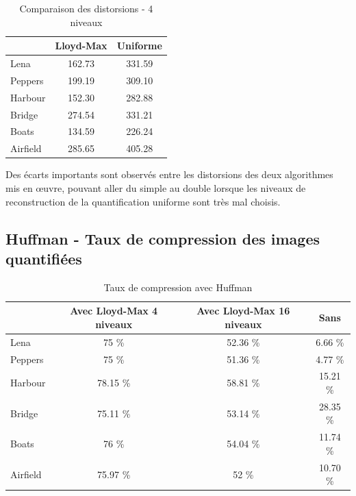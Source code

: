 \documentclass[a4paper, 12pt]{article}
\begin{document}
\begin{table}[!h]
	\centering
		\begin{tabular}{l|c|c|}
			\cline{2-3}
			                               & Lloyd-Max & Uniforme \\
			\hline
			\multicolumn{1}{|l|}{Lena}     & 162.73    &  331.59  \\
			\hline
			\multicolumn{1}{|l|}{Peppers}  & 199.19    &  309.10  \\
			\hline
			\multicolumn{1}{|l|}{Harbour}  & 152.30    &  282.88  \\
			\hline
			\multicolumn{1}{|l|}{Bridge}   & 274.54    &  331.21  \\
			\hline
			\multicolumn{1}{|l|}{Boats}    & 134.59    &  226.24  \\
			\hline
			\multicolumn{1}{|l|}{Airfield} & 285.65    &  405.28  \\
			\hline
		\end{tabular}
	\caption{Comparaison des distorsions - 4 niveaux}
	\label{tab:TableComparaisonDisto}
\end{table}

Des écarts importants sont observés entre les distorsions des deux algorithmes mis en œuvre, pouvant aller du simple au double lorsque les niveaux de reconstruction de la quantification uniforme sont très mal choisis.


\subsection{Huffman - Taux de compression des images quantifiées}


\begin{table}[H]
	\centering
		\begin{tabular}{l|c | c| c|}
			\cline{2-4}
			                               & Avec Lloyd-Max 4 niveaux & Avec Lloyd-Max 16 niveaux & Sans      \\
			\hline
			\multicolumn{1}{|l|}{Lena}     & 75 \%                    & 52.36 \%                  & 6.66 \%   \\
			\hline
			\multicolumn{1}{|l|}{Peppers}  & 75 \%                    & 51.36 \%                  & 4.77 \%   \\
			\hline
			\multicolumn{1}{|l|}{Harbour}  & 78.15 \%                 & 58.81 \%                  & 15.21 \%  \\
			\hline
			\multicolumn{1}{|l|}{Bridge}   & 75.11 \%                 & 53.14 \%                  & 28.35 \%  \\
			\hline
			\multicolumn{1}{|l|}{Boats}    & 76 \%                    & 54.04 \%                  & 11.74 \%  \\
			\hline
			\multicolumn{1}{|l|}{Airfield} & 75.97 \%                 & 52 \%                     & 10.70 \%  \\
			\hline
		\end{tabular}
	\caption{Taux de compression avec Huffman}
	\label{tab:TableComparaisonTauxCompression}
\end{table}
\end{document}
